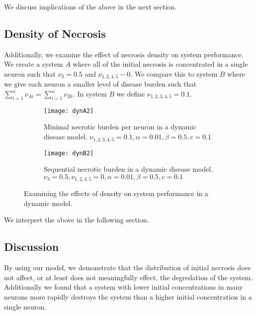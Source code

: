 \documentclass[11pt]{report}
\begin{document}
We discuss implications of the above in the next section. 


\subsection{Density of Necrosis} %
\label{sub:density_of_necrosis}


Additionally, we examine the effect of necrosis density on system performance. We create a system $A$ where all of the initial necrosis is concentrated in a single neuron such that $\nu_3 = 0.5$ and $\nu_{1,2,4,5} - 0$. We compare this to system $B$ where we give each neuron a smaller level of disease burden such that $\sum^n_{i=1} \nu_{Ai} = \sum^n_{i=1} \nu_{Bi}$. In system $B$ we define $\nu_{1,2,3,4,5} = 0.1$.


\begin{figure}
    \centering
    \begin{subfigure}[b]{0.48\textwidth}
        \texttt{[image: dynA2]}
        \caption{Minimal necrotic burden per neuron in a dynamic disease model. $\nu_{1,2,3,4,5} = 0.1, \alpha = 0.01, \beta = 0.5,c = 0.1$}
        \label{fig:dynA2}
    \end{subfigure}
    \hfill %
    \begin{subfigure}[b]{0.48\textwidth}
        \texttt{[image: dynB2]}
        \caption{Sequential necrotic burden in a dynamic disease model. $\nu_{3} = 0.5, \nu_{1,2,4,5} = 0, \alpha = 0.01, \beta = 0.5,c = 0.1$}
        \label{fig:dynB2}
    \end{subfigure}
    \caption{Examining the effects of density on system performance in a dynamic model. }\label{fig:dispersion}
\end{figure}


We interpret the above in the following section.


\subsection{Discussion} %
\label{sub:discussion}


By using our model, we demonstrate that the distribution of initial necrosis does not affect, or at least does not meaningfully effect, the degredation of the system. Additionally we found that a system with lower initial concentrations in many neurons more rapidly destroys the system than a higher initial concentration in a single neuron. 
\end{document}
